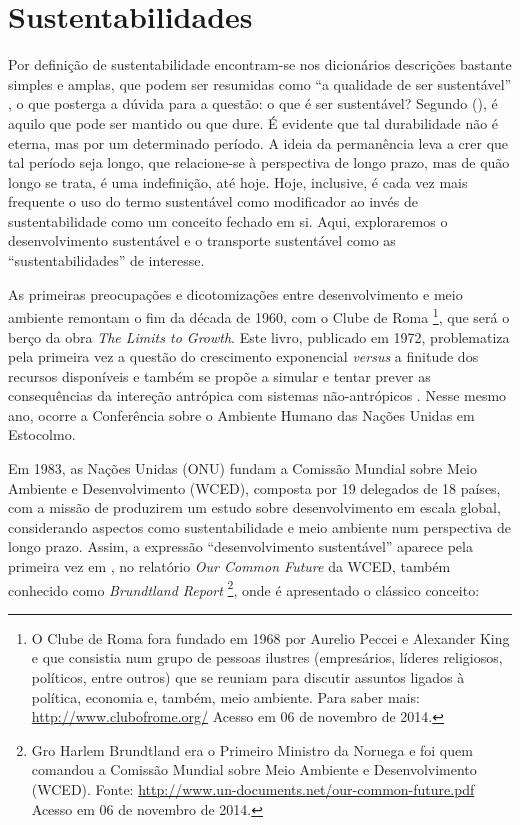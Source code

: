 \clearpage
\section{Sustentabilidades}

Por definição de sustentabilidade encontram-se nos dicionários descrições bastante simples e amplas, que podem ser resumidas como ``a qualidade de ser sustentável'' \cite{MICHAELIS2014}, o que posterga a dúvida para a questão: o que é ser sustentável? Segundo  (\citeyear{BLACK2010}), é aquilo que pode ser mantido ou que dure. É evidente que tal durabilidade não é eterna, mas por um determinado período. A ideia da permanência leva a crer que tal período seja longo, que relacione-se à perspectiva de longo prazo, mas de quão longo se trata, é uma indefinição, até hoje. Hoje, inclusive, é cada vez mais frequente o uso do termo sustentável como modificador ao invés de sustentabilidade como um conceito fechado em si. Aqui, exploraremos o desenvolvimento  sustentável e o transporte sustentável como as ``sustentabilidades'' de interesse.

As primeiras preocupações e dicotomizações entre desenvolvimento e meio ambiente remontam o fim da década de 1960, com o Clube de Roma
\footnote{O Clube de Roma fora fundado em 1968 por Aurelio Peccei e Alexander King e que consistia num grupo de pessoas ilustres (empresários, líderes religiosos, políticos, entre outros) que se reuniam para discutir assuntos ligados à política, economia e, também, meio ambiente. Para saber mais: \url{http://www.clubofrome.org/} Acesso em 06 de novembro de 2014.}, que será o berço da obra \emph{The Limits to Growth}. Este livro, publicado em 1972, problematiza pela primeira vez a questão do crescimento exponencial \emph{versus} a finitude dos recursos disponíveis e também se propõe a simular e tentar prever as consequências da intereção antrópica com sistemas não-antrópicos \cite{MEADOWS1972}. Nesse mesmo ano, ocorre a Conferência sobre o Ambiente Humano das Nações Unidas em Estocolmo.

Em 1983, as Nações Unidas (ONU) fundam a Comissão Mundial sobre Meio Ambiente e Desenvolvimento (WCED), composta por 19 delegados de 18 países, com a missão de produzirem um estudo sobre desenvolvimento em escala global, considerando aspectos como sustentabilidade e meio ambiente num perspectiva de longo prazo. Assim, a expressão ``desenvolvimento sustentável'' aparece pela primeira vez em \citeyear{WCED1987}, no relatório \emph{Our Common Future} da WCED, também conhecido como \emph{Brundtland Report} 
\footnote{Gro Harlem Brundtland era o Primeiro Ministro da Noruega e foi quem comandou a Comissão Mundial sobre Meio Ambiente e Desenvolvimento (WCED). Fonte: \url{http://www.un-documents.net/our-common-future.pdf} Acesso em 06 de novembro de 2014.}, onde é apresentado o clássico conceito:

